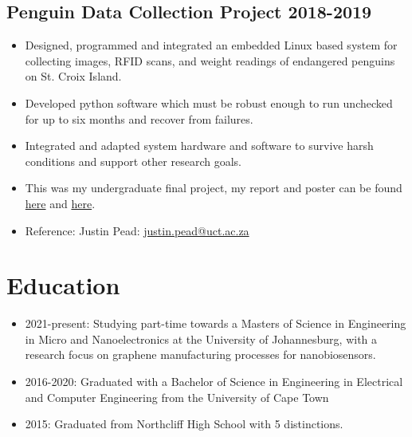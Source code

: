 \documentclass[10pt,a4paper,notitlepage]{article}
\begin{document}
\subsection*{Penguin Data Collection Project 2018-2019}
\begin{itemize}[noitemsep]
	\setlength\itemsep{0.02em}
    \item Designed, programmed and integrated an embedded Linux based system for collecting images,
        RFID scans, and weight readings of endangered penguins on St. Croix Island.
    \item Developed python software which must be robust enough to run unchecked for up to six months and recover from failures.
    \item Integrated and adapted system hardware and software to survive harsh conditions and support other research goals.
    \item This was my undergraduate final project, my report and poster can be found \href{https://awful.cloud/upl/thesis.pdf}{here} and \href{https://awful.cloud/upl/poster.pdf}{here}.
    \item Reference: Justin Pead: \href{mailto:justin.pead@uct.ac.za}{justin.pead@uct.ac.za}
\end{itemize}

\section*{Education}
\begin{itemize}[noitemsep]
	\setlength\itemsep{0.02em}
    \item 2021-present: Studying part-time towards a Masters of Science in Engineering in Micro and Nanoelectronics at the University of Johannesburg, with a research focus on graphene manufacturing processes for nanobiosensors.
    \item 2016-2020: Graduated with a Bachelor of Science in Engineering in Electrical and Computer Engineering from the University of Cape Town
    \item 2015: Graduated from Northcliff High School with 5 distinctions.
\end{itemize}
\end{document}
